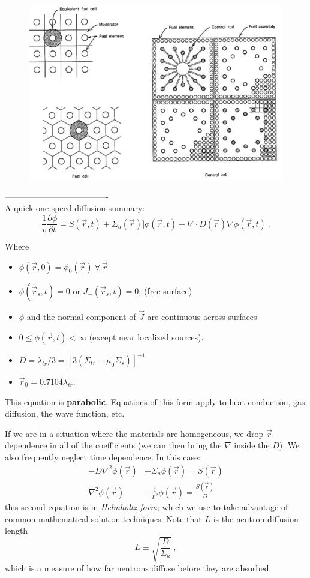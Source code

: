 \documentclass[12pt]{article}
\newcommand{\rvec}{\ensuremath{\vec{r}}}
\begin{document}
\begin{figure}
    \begin{center}
    \includegraphics[keepaspectratio, width = 5 in]{unit-cell}
    \end{center}
    \label{fig:phase_space}
\end{figure}

-------------------------------------\\
A quick one-speed diffusion summary:
\[\frac{1}{v} \frac{\partial \phi}{\partial t} = S(\rvec, t) + \Sigma_a(\rvec) ]\phi(\rvec, t) + \nabla \cdot D(\rvec) \nabla \phi(\rvec, t)\:.\]

Where
\begin{itemize}
\item $\phi(\rvec, 0) = \phi_0(\rvec) \: \forall \: \rvec$
\item $\phi(\tilde{\rvec_s}, t) = 0$ or $J_-(\rvec_s, t) = 0$; (free surface)
\item $\phi$ and the normal component of $\vec{J}$ are continuous across surfaces
\item $0 \leq \phi(\rvec, t) < \infty$ (except near localized sources).
\item $D = \lambda_{tr}/3 = [3(\Sigma_{tr} - \bar{\mu_0}\Sigma_s)]^{-1}$
\item $\rvec_0 = 0.7104 \lambda_{tr}$.
\end{itemize}
This equation is \textbf{parabolic}. Equations of this form apply to heat conduction, gas diffusion, the wave function, etc.

If we are in a situation where the materials are homogeneous, we drop $\rvec$ dependence in all of the coefficients (we can then bring the $\nabla$ inside the $D$). 
We also frequently neglect time dependence. 
In this case:
%
\begin{align*}
-D \nabla^2 \phi(\rvec) &+ \Sigma_a \phi(\rvec) = S(\rvec) \\
\nabla^2 \phi(\rvec) &- \frac{1}{L^2}\phi(\rvec) = \frac{S(\rvec)}{D}
\end{align*}
this second equation is in \textit{Helmholtz form}; which we use to take advantage of common mathematical solution techniques.
Note that $L$ is the neutron diffusion length
\[L \equiv \sqrt{\frac{D}{\Sigma_a}}\:,\]
which is a measure of how far neutrons diffuse before they are absorbed.
\end{document}
